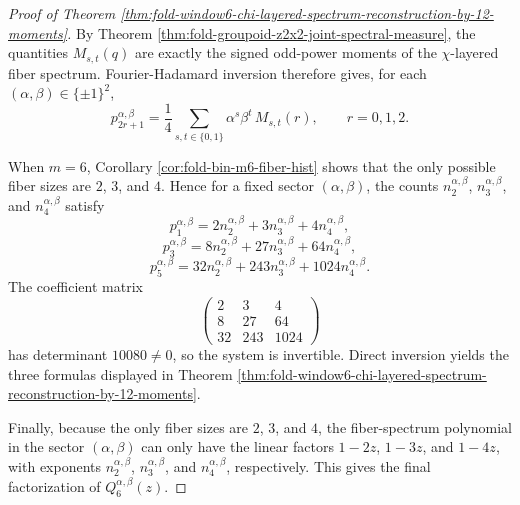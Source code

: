 \documentclass[12pt,a4paper]{article}
\theoremstyle{plain}
\theoremstyle{definition}
\numberwithin{equation}{section}
\begin{document}
\begin{proof}[Proof of Theorem \ref{thm:fold-window6-chi-layered-spectrum-reconstruction-by-12-moments}]
By Theorem \ref{thm:fold-groupoid-z2x2-joint-spectral-measure}, the quantities \(M_{s,t}(q)\) are exactly the signed odd-power moments of the \(\chi\)-layered fiber spectrum. Fourier-Hadamard inversion therefore gives, for each \((\alpha,\beta)\in\{\pm1\}^2\),
\[
p_{2r+1}^{\alpha,\beta}
=
\frac14\sum_{s,t\in\{0,1\}}\alpha^s\beta^t\,M_{s,t}(r),
\qquad r=0,1,2.
\]

When \(m=6\), Corollary \ref{cor:fold-bin-m6-fiber-hist} shows that the only possible fiber sizes are \(2\), \(3\), and \(4\). Hence for a fixed sector \((\alpha,\beta)\), the counts \(n_2^{\alpha,\beta}\), \(n_3^{\alpha,\beta}\), and \(n_4^{\alpha,\beta}\) satisfy
\[
p_1^{\alpha,\beta}=2n_2^{\alpha,\beta}+3n_3^{\alpha,\beta}+4n_4^{\alpha,\beta},
\]
\[
p_3^{\alpha,\beta}=8n_2^{\alpha,\beta}+27n_3^{\alpha,\beta}+64n_4^{\alpha,\beta},
\]
\[
p_5^{\alpha,\beta}=32n_2^{\alpha,\beta}+243n_3^{\alpha,\beta}+1024n_4^{\alpha,\beta}.
\]
The coefficient matrix
\[
\begin{pmatrix}
2&3&4\\
8&27&64\\
32&243&1024
\end{pmatrix}
\]
has determinant \(10080\neq 0\), so the system is invertible. Direct inversion yields the three formulas displayed in Theorem \ref{thm:fold-window6-chi-layered-spectrum-reconstruction-by-12-moments}.

Finally, because the only fiber sizes are \(2\), \(3\), and \(4\), the fiber-spectrum polynomial in the sector \((\alpha,\beta)\) can only have the linear factors \(1-2z\), \(1-3z\), and \(1-4z\), with exponents \(n_2^{\alpha,\beta}\), \(n_3^{\alpha,\beta}\), and \(n_4^{\alpha,\beta}\), respectively. This gives the final factorization of \(Q_6^{\alpha,\beta}(z)\).
\end{proof}



\end{document}
